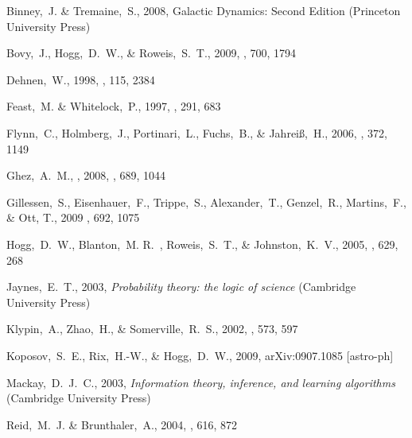 \begin{thebibliography}{99}

{Binney},~J. \& {Tremaine},~S., 2008, {Galactic Dynamics: Second Edition}
  (Princeton University Press)

 Bovy,~J., Hogg,~D.~W., \& Roweis,~S.~T., 2009,
  \apj, 700, 1794


 Dehnen,~W., 1998, \aj, 115, 2384

 Feast,~M. \& Whitelock,~P., 1997,
  \mnras, 291, 683

  Flynn,~C., Holmberg,~J., Portinari,~L., Fuchs,~B., \& Jahrei{\ss},~H., 2006,
  \mnras, 372, 1149


  Ghez,~A.~M., \etal, 2008,
  \apj, 689, 1044

  Gillessen,~S., Eisenhauer,~F., Trippe,~S., Alexander,~T., Genzel,~R., Martins,~F., \& Ott, T., 2009
  \apj, 692, 1075

  Hogg,~D.~W., Blanton,~M. R.~, Roweis,~S.~T., \& Johnston,~K.~V., 2005,
  \apj, 629, 268

  Jaynes,~E.~T., 2003,
  \textit{Probability theory: the logic of science} (Cambridge University Press)

  Klypin,~A., Zhao,~H., \& Somerville,~R.~S., 2002,
  \apj, 573, 597

 Koposov,~S.~E., Rix,~H.-W., \& Hogg,~D.~W., 2009, arXiv:0907.1085 [astro-ph]

  Mackay,~D.~J.~C., 2003,
  \textit{Information theory, inference, and learning algorithms} (Cambridge University Press)

  Reid,~M.~J. \& Brunthaler,~A., 2004,
  \apj, 616, 872


\end{thebibliography}
